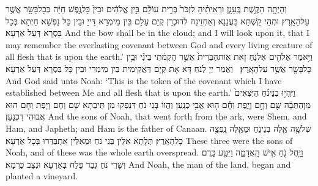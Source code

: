 {וְהָיְתָ֥ה הַקֶּ֖שֶׁת בֶּֽעָנָ֑ן וּרְאִיתִ֗יהָ לִזְכֹּר֙ בְּרִ֣ית עוֹלָ֔ם בֵּ֣ין אֱלֹהִ֔ים וּבֵין֙ כׇּל\maqqaf נֶ֣פֶשׁ חַיָּ֔ה בְּכׇל\maqqaf בָּשָׂ֖ר אֲשֶׁ֥ר עַל\maqqaf הָאָֽרֶץ׃}
{וּתְהֵי קַשְׁתָּא בַּעֲנָנָא וְאַחְזֵינַהּ לְדוּכְרַן קְיָם עָלַם בֵּין מֵימְרָא דַּייָ וּבֵין כָּל נַפְשָׁא חַיְתָא בְּכָל בִּסְרָא דְּעַל אַרְעָא׃}
{And the bow shall be in the cloud; and I will look upon it, that I may remember the everlasting covenant between God and every living creature of all flesh that is upon the earth.’}{}
{וַיֹּ֥אמֶר אֱלֹהִ֖ים אֶל\maqqaf נֹ֑חַ זֹ֤את אֽוֹת\maqqaf הַבְּרִית֙ אֲשֶׁ֣ר הֲקִמֹ֔תִי בֵּינִ֕י וּבֵ֥ין כׇּל\maqqaf בָּשָׂ֖ר אֲשֶׁ֥ר עַל\maqqaf הָאָֽרֶץ׃ \petucha }
{וַאֲמַר יְיָ לְנֹחַ דָּא אָת קְיָם דַּאֲקֵימִית בֵּין מֵימְרִי וּבֵין כָּל בִּסְרָא דְּעַל אַרְעָא׃}
{And God said unto Noah: ‘This is the token of the covenant which I have established between Me and all flesh that is upon the earth.’}{}
{וַיִּֽהְי֣וּ בְנֵי\maqqaf נֹ֗חַ הַיֹּֽצְאִים֙ מִן\maqqaf הַתֵּבָ֔ה שֵׁ֖ם וְחָ֣ם וָיָ֑פֶת וְחָ֕ם ה֖וּא אֲבִ֥י כְנָֽעַן׃}
{וַהֲווֹ בְּנֵי נֹחַ דִּנְפַקוּ מִן תֵּיבְתָא שֵׁם וְחָם וָיָפֶת וְחָם הוּא אֲבוּהִי דִּכְנָעַן׃}
{And the sons of Noah, that went forth from the ark, were Shem, and Ham, and Japheth; and Ham is the father of Canaan.}{}
{שְׁלֹשָׁ֥ה אֵ֖לֶּה בְּנֵי\maqqaf נֹ֑חַ וּמֵאֵ֖לֶּה נָֽפְצָ֥ה כׇל\maqqaf הָאָֽרֶץ׃}
{תְּלָתָא אִלֵּין בְּנֵי נֹחַ וּמֵאִלֵּין אִתְבַּדַּרוּ בְּכָל אַרְעָא׃}
{These three were the sons of Noah, and of these was the whole earth overspread.}{}
{וַיָּ֥חֶל נֹ֖חַ אִ֣ישׁ הָֽאֲדָמָ֑ה וַיִּטַּ֖ע כָּֽרֶם׃}
{וְשָׁרִי נֹחַ גְּבַר פָּלַח בְּאַרְעָא וּנְצַב כַּרְמָא׃}
{And Noah, the man of the land, began and planted a vineyard.}{}
